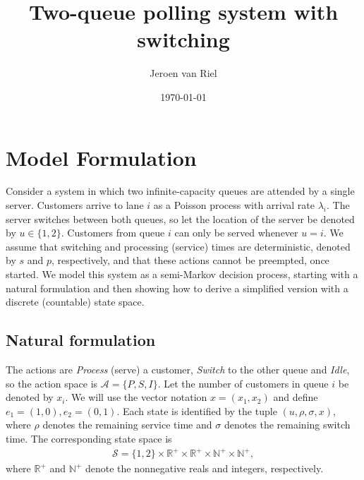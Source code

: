 \documentclass{article}
\author{Jeroen van Riel}
\date{\monthyeardate\today}
\title{Two-queue polling system with switching}
\theoremstyle{definition}
\theoremstyle{plain}
\begin{document}
\section{Model Formulation}
\label{sec:model}

Consider a system in which two infinite-capacity queues are attended by a single
server. Customers arrive to lane $i$ as a Poisson process with arrival rate
$\lambda_{i}$. The server switches between both queues, so let the location of the
server be denoted by $u \in \{1,2\}$. Customers from queue $i$ can only be served
whenever $u = i$. We assume that switching and processing (service) times are
deterministic, denoted by $s$ and $p$, respectively, and that these actions
cannot be preempted, once started. We model this system as a semi-Markov
decision process, starting with a natural formulation and then showing how to
derive a simplified version with a discrete (countable) state space.

\subsection{Natural formulation}

The actions are \textit{Process} (serve) a customer, \textit{Switch} to the other queue and \textit{Idle},
so the action space is $\mathcal{A} = \{ P, S, I \}$. Let the number of customers
in queue $i$ be denoted by $x_{i}$. We will use the vector notation
$x = (x_{1}, x_{2})$ and define $e_{1} = (1, 0), e_{2} = (0, 1)$. Each state is
identified by the tuple $(u, \rho, \sigma, x)$, where $\rho$ denotes the remaining service
time and $\sigma$ denotes the remaining switch time. The corresponding state space is
\begin{align}
  \mathcal{S} = \{1, 2\} \times \mathbb{R}^{+} \times \mathbb{R}^{+} \times \mathbb{N}^{+} \times \mathbb{N}^{+} ,
\end{align}
where $\mathbb{R}^{+}$ and $\mathbb{N}^{+}$ denote the nonnegative reals and
integers, respectively.
\end{document}
